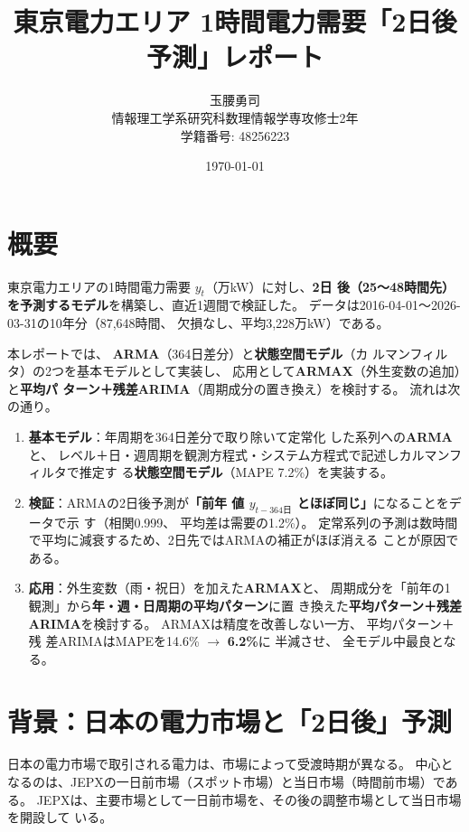 \documentclass[a4paper,11pt]{ltjsarticle}
\title{東京電力エリア 1時間電力需要「2日後予測」レポート}
\author{玉腰勇司 \\ 情報理工学系研究科数理情報学専攻修士2年 \\ 学籍番号: 48256223}
\date{\today}
\begin{document}
\maketitle

\section*{概要}

東京電力エリアの1時間電力需要 $y_t$（万kW）に対し、\textbf{2日
後（25〜48時間先）を予測するモデル}を構築し、直近1週間で検証した。
データは2016-04-01〜2026-03-31の10年分（87,648時間、
欠損なし、平均3,228万kW）である。

本レポートでは、%
\textbf{ARMA}（364日差分）と\textbf{状態空間モデル}（カ
ルマンフィルタ）の2つを基本モデルとして実装し、
応用として\textbf{ARMAX}（外生変数の追加）と\textbf{平均パ
ターン＋残差ARIMA}（周期成分の置き換え）を検討する。
流れは次の通り。

\begin{enumerate}
  \item \textbf{基本モデル}：年周期を364日差分で取り除いて定常化
  した系列への\textbf{ARMA}と、
  レベル＋日・週周期を観測方程式・システム方程式で記述しカルマンフィルタで推定す
  る\textbf{状態空間モデル}（MAPE 7.2\%）を実装する。
  \item \textbf{検証}：ARMAの2日後予測が\textbf{「前年
  値 $y_{t-364\text{日}}$ とほぼ同じ」}になることをデータで示
  す（相関0.999、
  平均差は需要の1.2\%）。
  定常系列の予測は数時間で平均に減衰するため、2日先ではARMAの補正がほぼ消える
  ことが原因である。
  \item \textbf{応用}：外生変数（雨・祝日）を加えた\textbf{ARMAX}と、
  周期成分を「前年の1観測」から\textbf{年・週・日周期の平均パターン}に置
  き換えた\textbf{平均パターン＋残差ARIMA}を検討する。%
  ARMAXは精度を改善しない一方、
  平均パターン＋残
  差ARIMAはMAPEを14.6\% $\rightarrow$ \textbf{6.2\%}に
  半減させ、
  全モデル中最良となる。
\end{enumerate}

\section{背景：日本の電力市場と「2日後」予測}

日本の電力市場で取引される電力は、市場によって受渡時期が異なる。
中心となるのは、JEPXの一日前市場（スポット市場）と当日市場（時間前市場）である。%
JEPXは、主要市場として一日前市場を、その後の調整市場として当日市場を開設して
いる\cite{jepx}。
\end{document}
